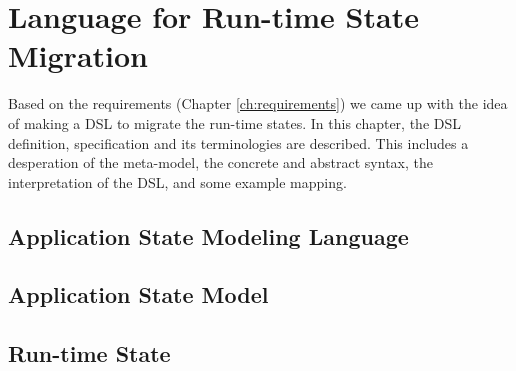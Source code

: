 \chapter{Language for Run-time State Migration}
\label{ch:language}
Based on the requirements (Chapter \ref{ch:requirements}) we came up with the idea of making a DSL to migrate the run-time states.
In this chapter, the DSL definition, specification and its terminologies are described. This includes a desperation of the meta-model, the concrete and abstract syntax, the interpretation of the DSL, and some example mapping.


\section{Application State Modeling Language}


\section{Application State Model}


\section{Run-time State}
